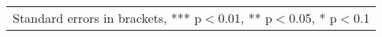\begin{table}
\begin{tabular}{lcc}
\multicolumn{3}{l}{Standard errors in brackets, *** p$<$0.01, ** p$<$0.05, * p$<$0.1} \\
\end{tabular}
\end{table}